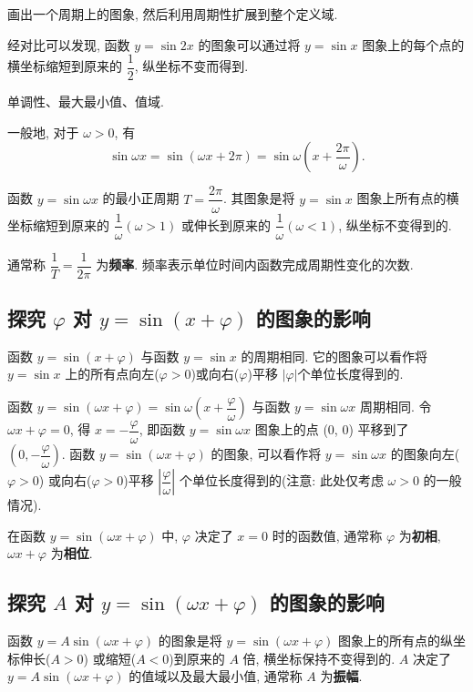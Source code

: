 \documentclass[titlepage]{ctexart}
\begin{document}
画出一个周期上的图象, 然后利用周期性扩展到整个定义域.

经对比可以发现, 函数 $y = \sin 2x$ 的图象可以通过将 $y = \sin x$ 图象上的每个点的横坐标缩短到原来的 $\dfrac{1}{2}$, 纵坐标不变而得到.

单调性、最大最小值、值域.

一般地, 对于 $\omega > 0$, 有
\[
\sin \omega x = \sin(\omega x + 2\pi) = \sin \omega(x + \frac{2\pi}{\omega}).
\]

函数 $y = \sin \omega x$ 的最小正周期 $T = \dfrac{2\pi}{\omega}$.
其图象是将 $y = \sin x$ 图象上所有点的横坐标缩短到原来的 $\dfrac{1}{\omega}(\omega > 1)$ 或伸长到原来的 $\dfrac{1}{\omega}(\omega < 1)$,
纵坐标不变得到的.

通常称 $\dfrac{1}{T} = \dfrac{1}{2\pi}$ 为\textbf{频率}. 频率表示单位时间内函数完成周期性变化的次数.

\subsection{探究 $\varphi$ 对 $y = \sin(x + \varphi)$ 的图象的影响}

函数 $y = \sin(x + \varphi)$ 与函数 $y = \sin x$ 的周期相同. 
它的图象可以看作将 $y = \sin x$ 上的所有点向左($\varphi > 0$)或向右($\varphi$)平移 $|\varphi|$个单位长度得到的.

函数 $y = \sin(\omega x + \varphi) = \sin \omega(x + \dfrac{\varphi}{\omega})$ 与函数 $y = \sin \omega x$ 周期相同.
令 $\omega x + \varphi = 0$, 得 $x = -\dfrac{\varphi}{\omega}$, 即函数 $y = \sin \omega x$ 图象上的点 (0, 0) 
平移到了 $(0, -\dfrac{\varphi}{\omega})$. 
函数 $y = \sin(\omega x + \varphi)$ 的图象, 可以看作将 $y = \sin \omega x$ 的图象向左($\varphi > 0$)
或向右($\varphi > 0$)平移 $\left |\dfrac{\varphi}{\omega}\right |$ 个单位长度得到的(注意: 此处仅考虑 $\omega > 0$ 的一般情况).

在函数 $y = \sin(\omega x + \varphi)$ 中, $\varphi$ 决定了 $x = 0$ 时的函数值, 
通常称 $\varphi$ 为\textbf{初相}, $\omega x + \varphi$ 为\textbf{相位}.

\subsection{探究 $A$ 对 $y = \sin(\omega x + \varphi)$ 的图象的影响}

函数 $y = A\sin(\omega x + \varphi)$ 的图象是将 $y = \sin(\omega x + \varphi)$ 图象上的所有点的纵坐标伸长($A > 0$)
或缩短($A < 0$)到原来的 $A$ 倍, 横坐标保持不变得到的. $A$ 决定了 $y = A\sin(\omega x + \varphi)$ 的值域以及最大最小值, 
通常称 $A$ 为\textbf{振幅}.
\end{document}
